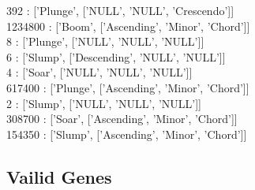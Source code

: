 {392     :  ['Plunge', ['NULL', 'NULL', 'Crescendo']]\\
1234800 :  ['Boom', ['Ascending', 'Minor', 'Chord']]\\
8       :  ['Plunge', ['NULL', 'NULL', 'NULL']]\\
6       :  ['Slump', ['Descending', 'NULL', 'NULL']]\\
4       :  ['Soar', ['NULL', 'NULL', 'NULL']]\\
617400  :  ['Plunge', ['Ascending', 'Minor', 'Chord']]\\
2       :  ['Slump', ['NULL', 'NULL', 'NULL']]\\
308700  :  ['Soar', ['Ascending', 'Minor', 'Chord']]\\
154350  :  ['Slump', ['Ascending', 'Minor', 'Chord']]}\\

\subsection*{Vailid Genes}

